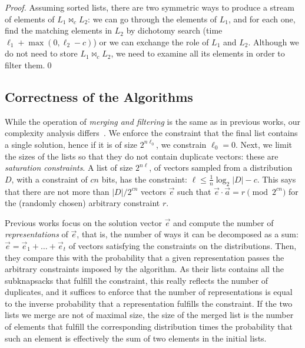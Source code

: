 \begin{proof}Assuming sorted lists, there are two symmetric ways to produce a stream of elements of $L_1 \bowtie_c L_2$: we can go through the elements of $L_1$, and for each one, find the matching elements in $L_2$ by dichotomy search (time $\ell_1 + \max(0, \ell_2 - c)$) or we can exchange the role of $L_1$ and $L_2$. Although we do not need to store $L_1 \bowtie_c L_2$, we need to examine all its elements in order to filter them.\qed
\end{proof}
%

\subsection{Correctness of the Algorithms}

While the operation of \emph{merging and filtering} is the same as in previous works, our complexity analysis differs~\cite{DBLP:conf/eurocrypt/Howgrave-GrahamJ10,DBLP:conf/eurocrypt/BeckerCJ11,DBLP:conf/pqcrypto/BernsteinJLM13,DBLP:conf/tqc/HelmM18}. We enforce the constraint that the final list contains a single solution, hence if it is of size $2^{n \ell_0}$, we constrain $\ell_0 = 0$. Next, we limit the sizes of the lists so that they do not contain duplicate vectors: these are \emph{saturation constraints}. A list of size $2^{n \ell}$, of vectors sampled from a distribution $D$, with a constraint of $cn$ bits, has the constraint: $\ell \leq \frac{1}{n}\log_2{|D|} - c$. This says that there are not more than $|D| / 2^{cn}$ vectors $\vec{e}$ such that $\vec{e} \cdot \vec{a} = r \pmod{2^{cn}}$ for the (randomly chosen) arbitrary constraint $r$.

Previous works focus on the solution vector $\vec{e}$ and compute the number of \emph{representations} of $\vec{e}$, that is, the number of ways it can be decomposed as a sum: $\vec{e} = \vec{e}_1 + \ldots + \vec{e}_t$ of vectors satisfying the constraints on the distributions. Then, they compare this with the probability that a given representation passes the arbitrary constraints imposed by the algorithm. As their lists contains all the subknapsacks that fulfill the constraint, this really reflects the number of duplicates, and it suffices to enforce that the number of representations is equal to the inverse probability that a representation fulfills the constraint. If the two lists we merge are not of maximal size, the size of the merged list is the number of elements that fulfill the corresponding distribution times the probability that such an element is effectively the sum of two elements in the initial lists.

